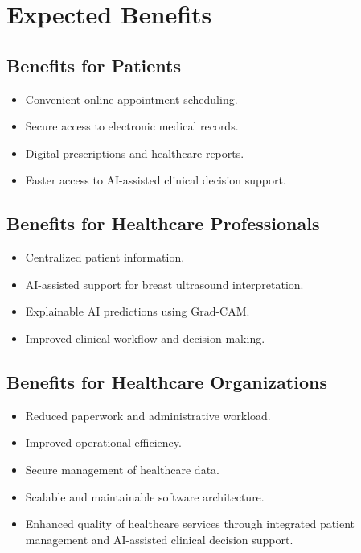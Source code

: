 \documentclass[12pt,a4paper]{report}
\begin{document}
\section{Expected Benefits}

\subsection*{Benefits for Patients}

\begin{itemize}[noitemsep]
    \item Convenient online appointment scheduling.
    \item Secure access to electronic medical records.
    \item Digital prescriptions and healthcare reports.
    \item Faster access to AI-assisted clinical decision support.
\end{itemize}

\subsection*{Benefits for Healthcare Professionals}
\begin{itemize}[noitemsep]
    \item Centralized patient information.
    \item AI-assisted support for breast ultrasound interpretation.
    \item Explainable AI predictions using Grad-CAM.
    \item Improved clinical workflow and decision-making.
\end{itemize}

\subsection*{Benefits for Healthcare Organizations}
\begin{itemize}[noitemsep]
    \item Reduced paperwork and administrative workload.
    \item Improved operational efficiency.
    \item Secure management of healthcare data.
    \item Scalable and maintainable software architecture.
    \item Enhanced quality of healthcare services through integrated patient management and AI-assisted clinical decision support.
\end{itemize}
\end{document}

